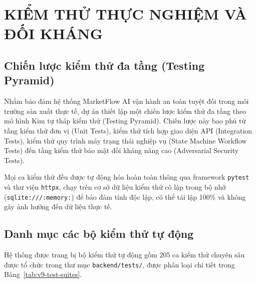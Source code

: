 \chapter{KIỂM THỬ THỰC NGHIỆM VÀ ĐỐI KHÁNG}

\section{Chiến lược kiểm thử đa tầng (Testing Pyramid)}

Nhằm bảo đảm hệ thống MarketFlow AI vận hành an toàn tuyệt đối trong môi trường sản xuất thực tế, dự án thiết lập một chiến lược kiểm thử đa tầng theo mô hình Kim tự tháp kiểm thử (Testing Pyramid). Chiến lược này bao phủ từ tầng kiểm thử đơn vị (Unit Tests), kiểm thử tích hợp giao diện API (Integration Tests), kiểm thử quy trình máy trạng thái nghiệp vụ (State Machine Workflow Tests) đến tầng kiểm thử bảo mật đối kháng nâng cao (Adversarial Security Tests).

Mọi ca kiểm thử đều được tự động hóa hoàn toàn thông qua framework \texttt{pytest} và thư viện \texttt{httpx}, chạy trên cơ sở dữ liệu kiểm thử cô lập trong bộ nhớ (\texttt{sqlite:///:memory:}) để bảo đảm tính độc lập, có thể tái lập 100\% và không gây ảnh hưởng đến dữ liệu thực tế.

\section{Danh mục các bộ kiểm thử tự động}

Hệ thống được trang bị bộ kiểm thử tự động gồm 205 ca kiểm thử chuyên sâu được tổ chức trong thư mục \texttt{backend/tests/}, được phân loại chi tiết trong Bảng~\ref{tab:v9-test-suites}.

